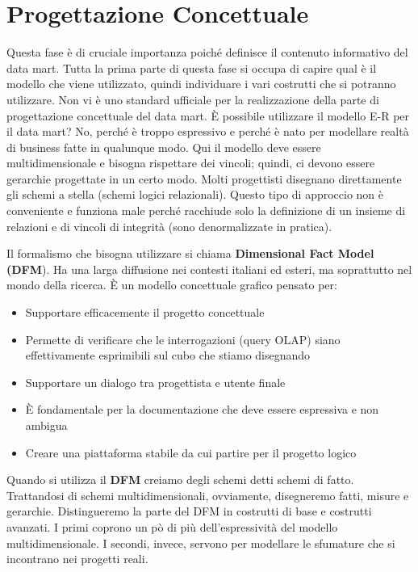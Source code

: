
\section{Progettazione Concettuale}
Questa fase è di cruciale importanza poiché definisce il contenuto informativo del data mart. Tutta la prima parte di questa fase si occupa di capire qual è il modello che viene utilizzato, quindi individuare i vari costrutti che si potranno utilizzare. Non vi è uno standard ufficiale per la realizzazione della parte di progettazione concettuale del data mart. È possibile utilizzare il modello E-R per il data mart? No, perché è troppo espressivo e perché è nato per modellare realtà di business fatte in qualunque modo. Qui il modello deve essere multidimensionale e bisogna rispettare dei vincoli; quindi, ci devono essere gerarchie progettate in un certo modo. Molti progettisti disegnano direttamente gli schemi a stella (schemi logici relazionali). Questo tipo di approccio non è conveniente e funziona male perché racchiude solo la definizione di un insieme di relazioni e di vincoli di integrità (sono denormalizzate in pratica). 

Il formalismo che bisogna utilizzare si chiama \textbf{Dimensional Fact Model (DFM}). Ha una larga diffusione nei contesti italiani ed esteri, ma soprattutto nel mondo della ricerca. È un modello concettuale grafico pensato per:
\begin{itemize}
	\item 
	Supportare efficacemente il progetto concettuale
	\item 
	Permette di verificare che le interrogazioni (query OLAP) siano effettivamente esprimibili sul cubo che stiamo disegnando 
	\item 
	Supportare un dialogo tra progettista e utente finale
	\item 
	È fondamentale per la documentazione che deve essere espressiva e non ambigua
	\item 
	Creare una piattaforma stabile da cui partire per il progetto logico
\end{itemize}

Quando si utilizza il \textbf{DFM} creiamo degli schemi detti schemi di fatto. Trattandosi di schemi multidimensionali, ovviamente, disegneremo fatti, misure e gerarchie. Distingueremo la parte del DFM in costrutti di base e costrutti avanzati. I primi coprono un pò di più dell’espressività del modello multidimensionale. I secondi, invece, servono per modellare le sfumature che si incontrano nei progetti reali. 
